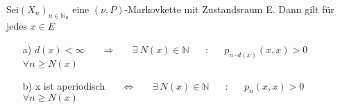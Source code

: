 \label{Korollar 2.6}
Sei$ (X_{n})_{n \in \mathbb{N}_{0}}$ eine $(\nu,P)$-Markovkette mit Zustandsraum E. Dann gilt für jedes $x \in E$
\begin{itemize}
\item[a)] $d(x) < \infty$ $\quad$ $\Rightarrow$ $\quad$ $\exists \: N(x) \in \mathbb{N}$ $\quad$ : $\quad$ $p_{n \cdot d(x)}(x,x)>0$ $\quad$  $\forall n \geq N(x)$
\item[b)] x ist aperiodisch $\quad$ $\Leftrightarrow$ $\quad$ $\exists \: N(x) \in \mathbb{N}$ $\quad$ : $\quad$ $p_{n}(x,x)>0$ $\quad$  $\forall n \geq N(x)$
\end{itemize}
